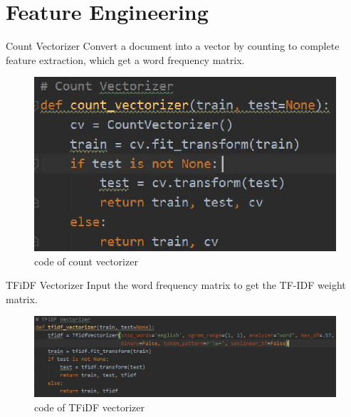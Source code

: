 \documentclass[
 size=14pt,
 paper=smartboard,  %
 mode=present, 		%
 display=slides, 	%
 style=tuliplab,  	%
 pauseslide,
 fleqn,leqno]{powerdot}
\begin{document}
\section{Feature Engineering}
\begin{slide}{Count Vectorizer}
	Convert a document into a vector by counting to complete feature extraction, which get a word frequency matrix.
	\begin{figure}[htbp]
		\includegraphics[scale=1.]{./figure1/6.eps}
		\caption{code of count vectorizer}
	\end{figure}
\end{slide}
\begin{slide}{TFiDF Vectorizer}
	Input the word frequency matrix to get the TF-IDF weight matrix.
	\begin{figure}[htbp]
		\includegraphics[scale=0.8]{./figure1/7.eps}
		\caption{code of TFiDF vectorizer}
	\end{figure}
\end{slide}
\end{document}
